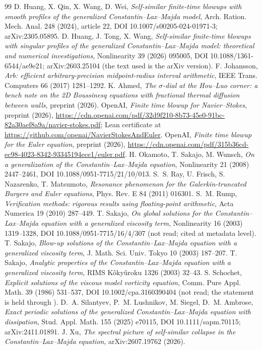 \documentclass[11pt,a4paper]{article}
\theoremstyle{plain}
\theoremstyle{definition}
\begin{document}
\begin{thebibliography}{99}
 D. Huang, X. Qin, X. Wang, D. Wei, \emph{Self-similar finite-time blowups with smooth profiles of the generalized Constantin--Lax--Majda model}, Arch. Ration. Mech. Anal. 248 (2024), article 22, DOI 10.1007/s00205-024-01971-3; arXiv:2305.05895.
 D. Huang, J. Tong, X. Wang, \emph{Self-similar finite-time blowups with singular profiles of the generalized Constantin--Lax--Majda model: theoretical and numerical investigations}, Nonlinearity 39 (2026) 095005, DOI 10.1088/1361-6544/ae9e21; arXiv:2603.25104 (the text used is the arXiv version).
 F. Johansson, \emph{Arb: efficient arbitrary-precision midpoint-radius interval arithmetic}, IEEE Trans. Computers 66 (2017) 1281--1292.
 K. Ahmed, \emph{The $\sigma$-dial at the Hou--Luo corner: a bench note on the 2D Boussinesq equations with fractional thermal diffusion between walls}, preprint (2026).
 OpenAI, \emph{Finite time blowup for Navier--Stokes}, preprint (2026), \url{https://cdn.openai.com/pdf/32d9f210-8b73-45e0-91bc-82a30aef8a9a/navier-stokes.pdf}; Lean certificate at \url{https://github.com/openai/NavierStokesAndEuler}.
 OpenAI, \emph{Finite time blowup for the Euler equation}, preprint (2026), \url{https://cdn.openai.com/pdf/315b36cd-ec98-4023-8342-93345194ece1/euler.pdf}.
 H. Okamoto, T. Sakajo, M. Wunsch, \emph{On a generalization of the Constantin--Lax--Majda equation}, Nonlinearity 21 (2008) 2447--2461, DOI 10.1088/0951-7715/21/10/013.
 S.~S. Ray, U. Frisch, S. Nazarenko, T. Matsumoto, \emph{Resonance phenomenon for the Galerkin-truncated Burgers and Euler equations}, Phys. Rev. E 84 (2011) 016301.
 S.~M. Rump, \emph{Verification methods: rigorous results using floating-point arithmetic}, Acta Numerica 19 (2010) 287--449.
 T. Sakajo, \emph{On global solutions for the Constantin--Lax--Majda equation with a generalized viscosity term}, Nonlinearity 16 (2003) 1319--1328, DOI 10.1088/0951-7715/16/4/307 (not read; cited at metadata level).
 T. Sakajo, \emph{Blow-up solutions of the Constantin--Lax--Majda equation with a generalized viscosity term}, J. Math. Sci. Univ. Tokyo 10 (2003) 187--207.
 T. Sakajo, \emph{Analytic properties of the Constantin--Lax--Majda equation with a generalized viscosity term}, RIMS Kôkyûroku 1326 (2003) 32--43.
 S. Schochet, \emph{Explicit solutions of the viscous model vorticity equation}, Comm. Pure Appl. Math. 39 (1986) 531--537, DOI 10.1002/cpa.3160390404 (not read; the statement is held through \cite[\S5.1]{ALSS24}).
 D.~A. Silantyev, P.~M. Lushnikov, M. Siegel, D.~M. Ambrose, \emph{Exact periodic solutions of the generalized Constantin--Lax--Majda equation with dissipation}, Stud. Appl. Math. 155 (2025) e70115, DOI 10.1111/sapm.70115; arXiv:2411.01891.
 J. Xu, \emph{The spectral picture of self-similar collapse in the Constantin--Lax--Majda equation}, arXiv:2607.19762 (2026).
\end{thebibliography}
\end{document}
